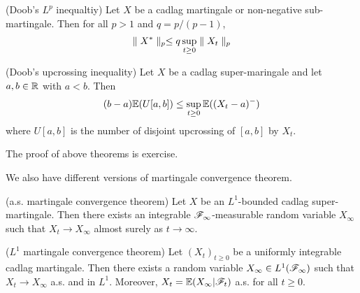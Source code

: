 \documentclass[10pt,a4paper]{report}
\newenvironment{proof}
{\begin{changemargin}{1cm}{0.5cm} 
	}%
	{\end{changemargin}
}
\begin{document}
(Doob's $L^p$ inequaltiy) Let $X$ be a cadlag martingale or non-negative sub-martingale. Then for all $p>1$ and $q = p/(p-1)$,
\begin{align*}
\parallel X^* \parallel_{p}  \leq q\sup_{t\geq 0} \parallel X_t \parallel_{p}
\end{align*}
\s

(Doob's upcrossing inequality) Let $X$ be a cadlag super-maringale and let $a,b\in \mathbb{R}$ with $a<b$. Then 
\begin{align*}
(b-a) \mathbb{E}(U[a,b]) \leq \sup_{t\geq 0} \mathbb{E}((X_t-a)^-)
\end{align*}
where $U[a,b]$ is the number of disjoint upcrossing of $[a,b]$ by $X_t$.
\begin{proof}
\pf The proof of above theorems is exercise.
\end{proof}
\s

We also have different versions of martingale convergence theorem.
\s

 (a.s. martingale convergence theorem) Let $X$ be an $L^1$-bounded cadlag super-martingale. Then there exists an integrable $\mathscr{F}_{\infty}$-measurable random variable $X_{\infty}$ such that $X_t \rightarrow X_{\infty}$ almost surely as $t\rightarrow \infty$. 
\s

 ($L^1$ martingale convergence theorem) Let $(X_t)_{t\geq 0}$ be a uniformly integrable cadlag martingale. Then there exists a random variable $X_{\infty} \in L^1(\mathscr{F}_{\infty})$ such that $X_t \rightarrow X_{\infty}$ a.s. and in $L^1$. Moreover, $X_t = \mathbb{E}(X_{\infty}|\mathscr{F}_t)$ a.s. for all $t\geq 0$.
\end{document}
